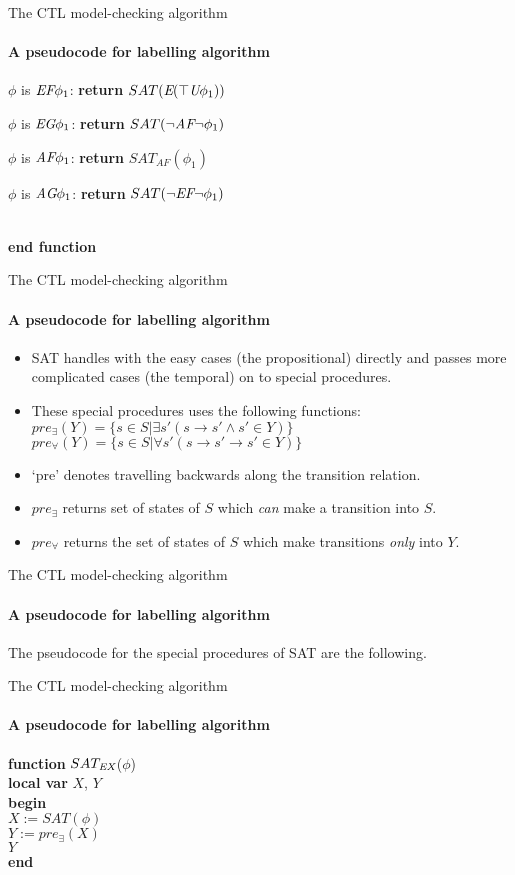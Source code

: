 \begin{frame}{The CTL model-checking algorithm}
	\framesubtitle{A pseudocode for labelling algorithm}
	\qquad  $\phi$ is $\textit{E}\textit{F} \phi_{1}$: {\bf return} $SAT(\textit{E}(\top \textit{U} \phi_{1}))$
	
	\qquad  $\phi$ is $\textit{E}\textit{G} \phi_{1}$: {\bf return} $SAT(\neg\textit{A}\textit{F}\neg \phi_{1})$
	
	\qquad  $\phi$ is $\textit{A}\textit{F} \phi_{1}$: {\bf return} $SAT_{AF}(\phi_{1})$
	
	\qquad  $\phi$ is $\textit{A}\textit{G} \phi_{1}$: {\bf return} $SAT(\neg\textit{E}\textit{F}\neg \phi_{1})$
	
	\\
	{\bf end function}
\end{frame}

\begin{frame}{The CTL model-checking algorithm}
	\framesubtitle{A pseudocode for labelling algorithm}
	\begin{itemize}
		\item
		{
			SAT handles with the easy cases (the propositional) directly and passes more complicated cases (the temporal) on to special procedures.
			\pause
		}
		\item
		{
			These special procedures uses the following functions:\\
			\pause
			$pre_{\exists}(Y) = \{ s \in S | \exists s' (s \to s' \land s' \in Y) \}$\\
			$pre_{\forall}(Y) = \{ s \in S | \forall s' (s \to s' \longrightarrow s' \in Y) \}$
			\pause
		}
		\item
		{
			`pre' denotes travelling backwards along the transition relation.
			\pause
		}
		\item
		{
			$pre_{\exists}$ returns set of states of $S$ which {\it can} make a transition into $S$.
			\pause
		}
		\item
		{
			$pre_{\forall}$ returns the set of states of $S$ which make transitions {\it only} into $Y$. 
		}
	\end{itemize}
\end{frame}

\begin{frame}{The CTL model-checking algorithm}
	\framesubtitle{A pseudocode for labelling algorithm}
	The pseudocode for the special procedures of SAT are the following.
\end{frame}

\begin{frame}{The CTL model-checking algorithm}
	\framesubtitle{A pseudocode for labelling algorithm}
	
	{\bf function} $SAT_{\textit{E}\textit{X}}$($\phi$)\\
	{\bf local var} $X$, $Y$\\
	{\bf begin}\\
	\qquad $X := SAT(\phi)$\\
	\qquad $Y := pre_{\exists}(X)$\\
	 $Y$\\
	{\bf end}
\end{frame}

